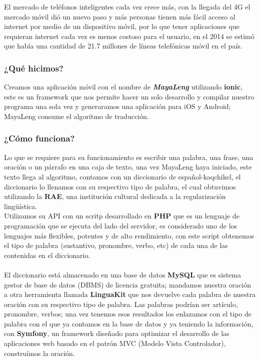 \documentclass[a4paper,openright,11pt]{article}
\begin{document}
El mercado de teléfonos inteligentes cada vez crece más, con la llegada del 4G el mercado móvil dió un nuevo paso y más personas tienen más fácil acceso al internet por medio de un dispositivo móvil, por lo que tener aplicaciones que requieran internet cada vez es menos costoso para el usuario, en el 2014 se estimó que había una cantidad de 21.7 millones de líneas telefónicas móvil en el país.

\subsubsection{¿Qué hicimos?}
Creamos una aplicación móvil con el nombre de \textbf{\textit{MayaLeng}} utilizando \textbf{ionic}, este es un framework que nos permite hacer un solo desarrollo y compilar nuestro programa una sola vez y generaramos una aplicación para iOS y Android; MayaLeng consume el algoritmo de traducción.

\subsubsection{¿Cómo funciona?}
Lo que se requiere para su funcionamiento es escribir una palabra, una frase, una oración o un párrafo en una caja de texto, una vez MayaLeng haya iniciado, este texto llega al algoritmo, contamos con un diccionario de español-kaqchikel, el diccionario lo llenamos con su respectivo tipo de palabra, el cual obtuvimos utilizando la \textbf{RAE}, una institución cultural dedicada a la regularización lingüística.\\
Utilizamos su API con un scritp desarrollado en \textbf{PHP} que es un lenguaje de programación que se ejecuta del lado del servidor, es considerado uno de los lenguajes más flexibles, potentes y de alto rendimiento,  con este script obtenemos el tipo de palabra (sustantivo, pronombre, verbo, etc) de cada una de las contenidas en el diccionario.\\\\

El diccionario está almacenado en una base de datos \textbf{MySQL} que es sistema gestor de base de datos (DBMS) de licencia gratuita; mandamos nuestra oración a otra herramienta llamada \textbf{LinguaKit} que nos devuelve cada palabra de nuestra oración con su respectivo tipo de palabra. Las palabras podrían ser artículo, pronombre, verbos; una vez tenemos esos resultados los enlazamos con el tipo de palabra con el que ya contamos en la base de datos y ya teniendo la información, con \textbf{Symfony}, un framework diseñado para optimizar el desarrollo de las aplicaciones web basado en el patrón MVC (Modelo Vista Controlador), construímos la oración.\\\\
\end{document}
